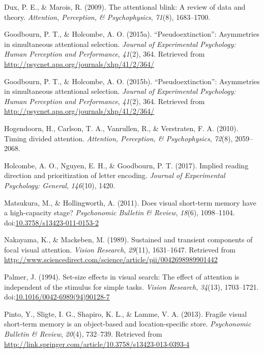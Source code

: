 \documentclass[,man]{apa6}
\theoremstyle{definition}
\theoremstyle{definition}
\theoremstyle{definition}
\theoremstyle{remark}
\begin{document}
\hypertarget{ref-dux_attentional_2009}{}
Dux, P. E., \& Marois, R. (2009). The attentional blink: A review of
data and theory. \emph{Attention, Perception, \& Psychophysics},
\emph{71}(8), 1683--1700.

\hypertarget{ref-goodbourn_pseudoextinction_2015}{}
Goodbourn, P. T., \& Holcombe, A. O. (2015a). ``Pseudoextinction'':
Asymmetries in simultaneous attentional selection. \emph{Journal of
Experimental Psychology: Human Perception and Performance},
\emph{41}(2), 364. Retrieved from
\url{http://psycnet.apa.org/journals/xhp/41/2/364/}

\hypertarget{ref-goodbourn_pseudoextinction}{}
Goodbourn, P. T., \& Holcombe, A. O. (2015b). ``Pseudoextinction'':
Asymmetries in simultaneous attentional selection. \emph{Journal of
Experimental Psychology: Human Perception and Performance},
\emph{41}(2), 364. Retrieved from
\url{http://psycnet.apa.org/journals/xhp/41/2/364/}

\hypertarget{ref-hogendoorn_timing_2010}{}
Hogendoorn, H., Carlson, T. A., Vanrullen, R., \& Verstraten, F. A.
(2010). Timing divided attention. \emph{Attention, Perception, \&
Psychophysics}, \emph{72}(8), 2059--2068.

\hypertarget{ref-holcombe_implied_2017}{}
Holcombe, A. O., Nguyen, E. H., \& Goodbourn, P. T. (2017). Implied
reading direction and prioritization of letter encoding. \emph{Journal
of Experimental Psychology: General}, \emph{146}(10), 1420.

\hypertarget{ref-matsukura_does_2011}{}
Matsukura, M., \& Hollingworth, A. (2011). Does visual short-term memory
have a high-capacity stage? \emph{Psychonomic Bulletin \& Review},
\emph{18}(6), 1098--1104.
doi:\href{https://doi.org/10.3758/s13423-011-0153-2}{10.3758/s13423-011-0153-2}

\hypertarget{ref-nakayama_sustained_1989}{}
Nakayama, K., \& Mackeben, M. (1989). Sustained and transient components
of focal visual attention. \emph{Vision Research}, \emph{29}(11),
1631--1647. Retrieved from
\url{http://www.sciencedirect.com/science/article/pii/0042698989901442}

\hypertarget{ref-palmer_set-size_1994}{}
Palmer, J. (1994). Set-size effects in visual search: The effect of
attention is independent of the stimulus for simple tasks. \emph{Vision
Research}, \emph{34}(13), 1703--1721.
doi:\href{https://doi.org/10.1016/0042-6989(94)90128-7}{10.1016/0042-6989(94)90128-7}

\hypertarget{ref-pinto_fragile_2013}{}
Pinto, Y., Sligte, I. G., Shapiro, K. L., \& Lamme, V. A. (2013).
Fragile visual short-term memory is an object-based and
location-specific store. \emph{Psychonomic Bulletin \& Review},
\emph{20}(4), 732--739. Retrieved from
\url{http://link.springer.com/article/10.3758/s13423-013-0393-4}
\end{document}
